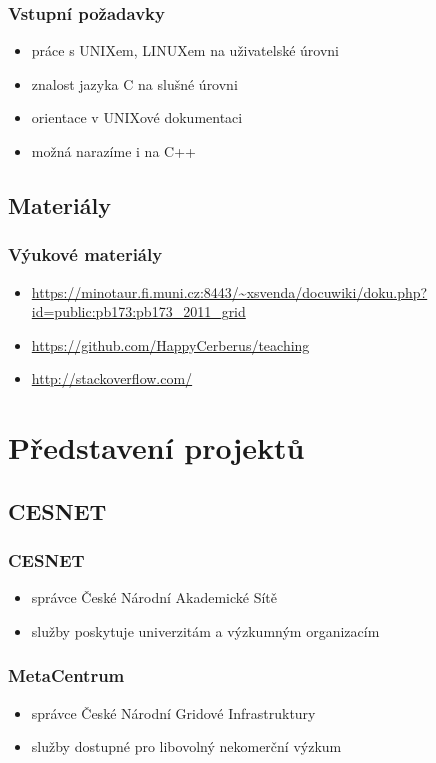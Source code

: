 \begin{frame}
	\frametitle{Vstupní požadavky}
	\begin{itemize}
		\item{práce s UNIXem, LINUXem na uživatelské úrovni}
		\item{znalost jazyka C na slušné úrovni}
		\item{orientace v UNIXové dokumentaci}
		\item{možná narazíme i na C++}
	\end{itemize}
\end{frame}

\subsection{Materiály}

\begin{frame}
	\frametitle{Výukové materiály}
	\begin{itemize}
		\item{\url{https://minotaur.fi.muni.cz:8443/~xsvenda/docuwiki/doku.php?id=public:pb173:pb173\_2011\_grid}}
		\item{\url{https://github.com/HappyCerberus/teaching}}
		\item{\url{http://stackoverflow.com/}}
	\end{itemize}
\end{frame}

\section{Představení projektů}
\subsection{CESNET}

\begin{frame}
	\frametitle{CESNET}
	\begin{itemize}
		\item{správce České Národní Akademické Sítě}
		\item{služby poskytuje univerzitám a výzkumným organizacím}
	\end{itemize}
\end{frame}

\begin{frame}
	\frametitle{MetaCentrum}
	\begin{itemize}
		\item{správce České Národní Gridové Infrastruktury}
		\item{služby dostupné pro libovolný nekomerční výzkum}
	\end{itemize}
\end{frame}

